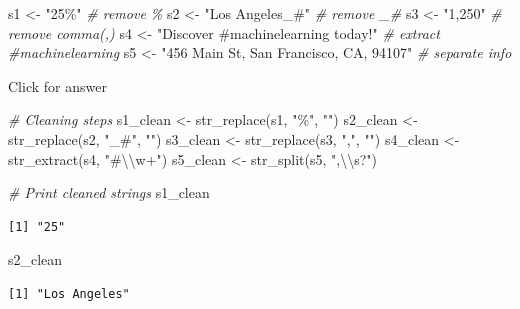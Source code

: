 \documentclass[
]{book}
\newenvironment{Shaded}{\begin{snugshade}}{\end{snugshade}}
\newcommand{\CommentTok}[1]{\textcolor[rgb]{0.56,0.35,0.01}{\textit{#1}}}
\newcommand{\FunctionTok}[1]{\textcolor[rgb]{0.00,0.00,0.00}{#1}}
\newcommand{\NormalTok}[1]{#1}
\newcommand{\OtherTok}[1]{\textcolor[rgb]{0.56,0.35,0.01}{#1}}
\newcommand{\SpecialCharTok}[1]{\textcolor[rgb]{0.00,0.00,0.00}{#1}}
\newcommand{\StringTok}[1]{\textcolor[rgb]{0.31,0.60,0.02}{#1}}
\begin{document}
\begin{Shaded}
\begin{Highlighting}[]
\NormalTok{s1 }\OtherTok{\textless{}{-}} \StringTok{"25\%"}  \CommentTok{\# remove \%}
\NormalTok{s2 }\OtherTok{\textless{}{-}} \StringTok{"Los Angeles\_\#"}  \CommentTok{\# remove \_\#}
\NormalTok{s3 }\OtherTok{\textless{}{-}} \StringTok{"1,250"}    \CommentTok{\# remove comma(,)}
\NormalTok{s4 }\OtherTok{\textless{}{-}} \StringTok{"Discover \#machinelearning today!"}   \CommentTok{\# extract \#machinelearning}
\NormalTok{s5 }\OtherTok{\textless{}{-}} \StringTok{"456 Main St, San Francisco, CA, 94107"}   \CommentTok{\# separate info}
\end{Highlighting}
\end{Shaded}

Click for answer

\begin{Shaded}
\begin{Highlighting}[]
\CommentTok{\# Cleaning steps}
\NormalTok{s1\_clean }\OtherTok{\textless{}{-}} \FunctionTok{str\_replace}\NormalTok{(s1, }\StringTok{"\%"}\NormalTok{, }\StringTok{""}\NormalTok{)}
\NormalTok{s2\_clean }\OtherTok{\textless{}{-}} \FunctionTok{str\_replace}\NormalTok{(s2, }\StringTok{"\_\#"}\NormalTok{, }\StringTok{""}\NormalTok{)}
\NormalTok{s3\_clean }\OtherTok{\textless{}{-}} \FunctionTok{str\_replace}\NormalTok{(s3, }\StringTok{","}\NormalTok{, }\StringTok{""}\NormalTok{)}
\NormalTok{s4\_clean }\OtherTok{\textless{}{-}} \FunctionTok{str\_extract}\NormalTok{(s4, }\StringTok{"\#}\SpecialCharTok{\textbackslash{}\textbackslash{}}\StringTok{w+"}\NormalTok{)}
\NormalTok{s5\_clean }\OtherTok{\textless{}{-}} \FunctionTok{str\_split}\NormalTok{(s5, }\StringTok{",}\SpecialCharTok{\textbackslash{}\textbackslash{}}\StringTok{s?"}\NormalTok{)}

\CommentTok{\# Print cleaned strings}
\NormalTok{s1\_clean}
\end{Highlighting}
\end{Shaded}

\begin{verbatim}
[1] "25"
\end{verbatim}

\begin{Shaded}
\begin{Highlighting}[]
\NormalTok{s2\_clean}
\end{Highlighting}
\end{Shaded}

\begin{verbatim}
[1] "Los Angeles"
\end{verbatim}
\end{document}
